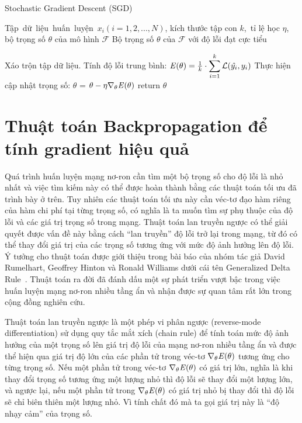 \begin{algorithm}
	\caption{Stochastic Gradient Descent (SGD)} \label{alg:SGD}
	\begin{algorithmic}[1]
		\renewcommand{\algorithmicrequire}{\textbf{Đầu vào:}}
		\renewcommand{\algorithmicensure}{\textbf{Đầu ra:}}
		\algnewcommand{}
		\algnewcommand\Operation{\item[\algorithmicoperation]}

		\Require Tập dữ liệu huấn luyện $x_i (i = 1, 2, ..., N)$, kích thước tập con $k$, tỉ lệ học $\eta$, bộ trọng số $\theta$ của mô hình $\mathcal{F}$
		\Ensure Bộ trọng số $\theta$ của $\mathcal{F}$ với độ lỗi đạt cực tiểu

		\Operation
			\State Xáo trộn tập dữ liệu.
				\State Tính độ lỗi trung bình: $\mathbf{\it{E}(\theta)} = \frac{1}{k}\cdot \displaystyle\sum_{i=1}^{k}\mathcal{L}(\hat{y_i}, y_i)$
				\State Thực hiện cập nhật trọng số: $\theta$ = $\theta - \eta \nabla_{\theta} \mathbf{\it{E}(\theta)}$
			\EndFor
		\EndWhile
		\State return $\theta$
	\end{algorithmic}
\end{algorithm}

\section{Thuật toán Backpropagation để tính gradient hiệu quả}

Quá trình huấn luyện mạng nơ-ron cần tìm một bộ trọng số cho độ lỗi là nhỏ nhất và việc tìm kiếm này có thể được hoàn thành bằng các thuật toán tối ưu đã trình bày ở trên. Tuy nhiên các thuật toán tối ưu này cần véc-tơ đạo hàm riêng của hàm chi phí tại từng trọng số, có nghĩa là ta muốn tìm sự phụ thuộc của độ lỗi và các giá trị trọng số trong mạng. Thuật toán lan truyền ngược có thể giải quyết được vấn đề này bằng cách ``lan truyền'' độ lỗi trở lại trong mạng, từ đó có thể thay đổi giá trị của các trọng số tương ứng với mức độ ảnh hưởng lên độ lỗi. Ý tưởng cho thuật toán được giới thiệu trong bài báo của nhóm tác giả David Rumelhart, Geoffrey Hinton và Ronald Williams dưới cái tên Generalized Delta Rule~\cite{rumelhart1986learning}. Thuật toán ra đời đã đánh dấu một sự phát triển vượt bậc trong việc huấn luyện mạng nơ-ron nhiều tầng ẩn và nhận được sự quan tâm rất lớn trong cộng đồng nghiên cứu.

Thuật toán lan truyền ngược là một phép vi phân ngược (reverse-mode differentiation) sử dụng quy tắc mắt xích (chain rule) để tính toán mức độ ảnh hưởng của một trọng số lên giá trị độ lỗi của mạng nơ-ron nhiều tầng ẩn và được thể hiện qua giá trị độ lớn của các phần tử trong véc-tơ $\nabla_\theta \mathbf{\it{E}(\theta)}$ tương ứng cho từng trọng số. Nếu một phần tử trong véc-tơ $\nabla_\theta \mathbf{\it{E}(\theta)}$ có giá trị lớn, nghĩa là khi thay đổi trọng số tương ứng một lượng nhỏ thì độ lỗi sẽ thay đổi một lượng lớn, và ngược lại, nếu một phần tử trong $\nabla_\theta \mathbf{\it{E}(\theta)}$ có giá trị nhỏ bị thay đổi thì độ lỗi sẽ chỉ biên thiên một lượng nhỏ. Vì tính chất đó mà ta gọi giá trị này là ``độ nhạy cảm'' của trọng số.

